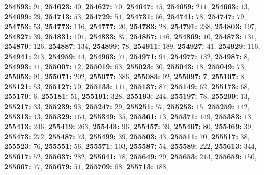 \textsf{\bfseries 254593:} $91$, \textsf{\bfseries 254623:} $40$, \textsf{\bfseries 254627:} $70$, \textsf{\bfseries 254647:} $45$, \textsf{\bfseries 254659:} $211$, \textsf{\bfseries 254663:} $13$, \textsf{\bfseries 254699:} $29$, \textsf{\bfseries 254713:} $53$, \textsf{\bfseries 254729:} $51$, \textsf{\bfseries 254731:} $66$, \textsf{\bfseries 254741:} $78$, \textsf{\bfseries 254747:} $79$, \textsf{\bfseries 254753:} $53$, \textsf{\bfseries 254773:} $116$, \textsf{\bfseries 254777:} $20$, \textsf{\bfseries 254783:} $28$, \textsf{\bfseries 254791:} $238$, \textsf{\bfseries 254803:} $197$, \textsf{\bfseries 254827:} $39$, \textsf{\bfseries 254831:} $101$, \textsf{\bfseries 254833:} $87$, \textsf{\bfseries 254857:} $146$, \textsf{\bfseries 254869:} $10$, \textsf{\bfseries 254873:} $131$, \textsf{\bfseries 254879:} $126$, \textsf{\bfseries 254887:} $134$, \textsf{\bfseries 254899:} $78$, \textsf{\bfseries 254911:} $189$, \textsf{\bfseries 254927:} $41$, \textsf{\bfseries 254929:} $116$, \textsf{\bfseries 254941:} $213$, \textsf{\bfseries 254959:} $44$, \textsf{\bfseries 254963:} $71$, \textsf{\bfseries 254971:} $94$, \textsf{\bfseries 254977:} $132$, \textsf{\bfseries 254987:} $8$, \textsf{\bfseries 254993:} $41$, \textsf{\bfseries 255007:} $12$, \textsf{\bfseries 255019:} $63$, \textsf{\bfseries 255023:} $30$, \textsf{\bfseries 255043:} $18$, \textsf{\bfseries 255049:} $73$, \textsf{\bfseries 255053:} $91$, \textsf{\bfseries 255071:} $202$, \textsf{\bfseries 255077:} $386$, \textsf{\bfseries 255083:} $92$, \textsf{\bfseries 255097:} $7$, \textsf{\bfseries 255107:} $8$, \textsf{\bfseries 255121:} $53$, \textsf{\bfseries 255127:} $70$, \textsf{\bfseries 255133:} $111$, \textsf{\bfseries 255137:} $87$, \textsf{\bfseries 255149:} $62$, \textsf{\bfseries 255173:} $68$, \textsf{\bfseries 255179:} $6$, \textsf{\bfseries 255181:} $51$, \textsf{\bfseries 255191:} $328$, \textsf{\bfseries 255193:} $244$, \textsf{\bfseries 255197:} $78$, \textsf{\bfseries 255209:} $13$, \textsf{\bfseries 255217:} $33$, \textsf{\bfseries 255239:} $93$, \textsf{\bfseries 255247:} $29$, \textsf{\bfseries 255251:} $57$, \textsf{\bfseries 255253:} $15$, \textsf{\bfseries 255259:} $142$, \textsf{\bfseries 255313:} $13$, \textsf{\bfseries 255329:} $164$, \textsf{\bfseries 255349:} $35$, \textsf{\bfseries 255361:} $13$, \textsf{\bfseries 255371:} $149$, \textsf{\bfseries 255383:} $13$, \textsf{\bfseries 255413:} $246$, \textsf{\bfseries 255419:} $263$, \textsf{\bfseries 255443:} $96$, \textsf{\bfseries 255457:} $39$, \textsf{\bfseries 255467:} $80$, \textsf{\bfseries 255469:} $39$, \textsf{\bfseries 255473:} $272$, \textsf{\bfseries 255487:} $73$, \textsf{\bfseries 255499:} $39$, \textsf{\bfseries 255503:} $43$, \textsf{\bfseries 255511:} $70$, \textsf{\bfseries 255517:} $38$, \textsf{\bfseries 255523:} $76$, \textsf{\bfseries 255551:} $56$, \textsf{\bfseries 255571:} $103$, \textsf{\bfseries 255587:} $54$, \textsf{\bfseries 255589:} $222$, \textsf{\bfseries 255613:} $344$, \textsf{\bfseries 255617:} $52$, \textsf{\bfseries 255637:} $282$, \textsf{\bfseries 255641:} $78$, \textsf{\bfseries 255649:} $29$, \textsf{\bfseries 255653:} $214$, \textsf{\bfseries 255659:} $150$, \textsf{\bfseries 255667:} $77$, \textsf{\bfseries 255679:} $51$, \textsf{\bfseries 255709:} $68$, \textsf{\bfseries 255713:} $188$, 
